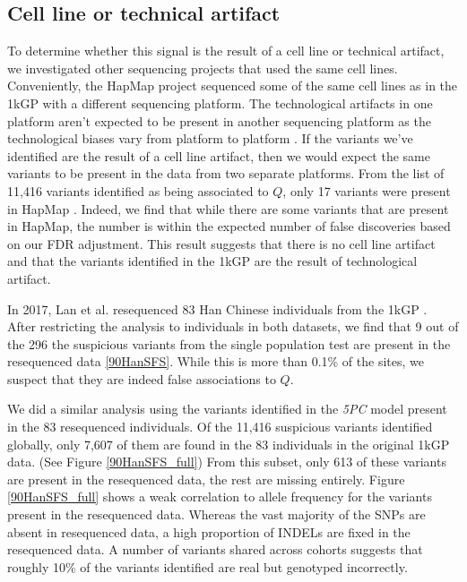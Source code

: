 \documentclass[9pt,lineno]{elife}
\begin{document}
\subsection{Cell line or technical artifact}

To determine whether this signal is the result of a cell line or technical artifact, we investigated other sequencing projects that used the same cell lines.
Conveniently, the HapMap project sequenced some of the same cell lines as in the 1kGP with a different sequencing platform.
The technological artifacts in one platform aren't expected to be present in another sequencing platform as the technological biases vary from platform to platform \citep{Minoche2011}.
If the variants we've identified are the result of a cell line artifact, then we would expect the same variants to be present in the data from two separate platforms.
From the list of 11,416 variants identified as being associated to $Q$, only 17 variants were present in HapMap \citep{HapMap2005}.
Indeed, we find that while there are some variants that are present in HapMap, the number is within the expected number of false discoveries based on our FDR adjustment.
This result suggests that there is no cell line artifact and that the variants identified in the 1kGP are the result of technological artifact.

In 2017, Lan et al. resequenced 83 Han Chinese individuals from the 1kGP \citep{Lan2017}.
After restricting the analysis to individuals in both datasets, we find that 9 out of the 296 the suspicious variants from the single population test are present in the resequenced data \ref{90HanSFS}.
While this is more than 0.1\% of the sites, we suspect that they are indeed false associations to $Q$.

We did a similar analysis using the variants identified in the \textit{5PC} model present in the 83 resequenced individuals.
Of the 11,416 suspicious variants identified globally, only 7,607 of them are found in the 83 individuals in the original 1kGP data. (See Figure \ref{90HanSFS_full})
From this subset, only 613 of these variants are present in the resequenced data, the rest are missing entirely.
Figure \ref{90HanSFS_full} shows a weak correlation to allele frequency for the variants present in the resequenced data.
Whereas the vast majority of the SNPs are absent in resequenced data, a high proportion of INDELs are fixed in the resequenced data.
A number of variants shared across cohorts suggests that roughly 10\% of the variants identified are real but genotyped incorrectly.
\end{document}
